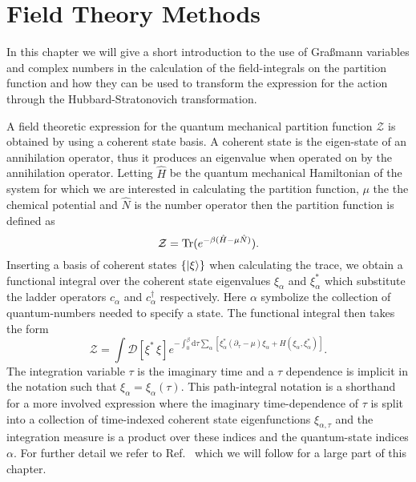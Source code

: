 \chapter{Field Theory Methods}
\label{chap:Field}
%
\noindent In this chapter we will give a short introduction to the use of Gra\ss mann variables
and complex numbers in the calculation of the field-integrals on the
partition function and how they can be used to transform the
expression for the action through the Hubbard-Stratonovich transformation.

A field theoretic expression for the quantum mechanical partition function $\mathcal{Z}$
is obtained by using a coherent state basis. A coherent state is the eigen-state of an annihilation operator, thus it
produces an eigenvalue when operated on by the annihilation operator. Letting $\hat{H}$ be the quantum mechanical
Hamiltonian of the system for which we are interested in calculating the partition function, $\mu$ the the chemical
potential and $\hat{N}$ is the number operator then the partition function is defined as
\begin{equation}
    \label{eq:Field:partitionFunction}
    \mathcal{Z} = \operatorname{Tr}(e^{-\beta(\hat{H}-\mu\hat{N})}).
\end{equation}
Inserting a basis of coherent states $\{\lvert \xi \rangle\}$ when calculating the trace, we obtain a functional integral over
the coherent state eigenvalues $\xi_\alpha$ and $\xi^\ast_\alpha$ which substitute the ladder operators
$c_\alpha$ and $c_\alpha^\dagger$ respectively. Here $\alpha$ symbolize the collection of quantum-numbers needed to specify
a state. The functional integral then takes the form
\begin{equation}
    \label{eq:Field:fieldPartition}
    \mathcal{Z} = \int\!\mathcal{D}[\xi^\ast\,\xi]e^{-\int_0^\beta\!\mathrm{d}\tau\sum_\alpha [\xi^\ast_\alpha(\partial_\tau-\mu)\xi_\alpha + H(\xi_\alpha,\xi_\alpha^\ast)]}.
\end{equation}
The integration variable $\tau$ is the imaginary time and a $\tau$ dependence is implicit in the notation such that $\xi_\alpha = \xi_\alpha(\tau)$.
This path-integral notation is a shorthand for a more involved expression where the imaginary time-dependence of $\tau$ is
split into a collection of time-indexed coherent state eigenfunctions $\xi_{\alpha,\tau}$ and the integration measure
is a product over these indices and the quantum-state indices $\alpha$. For further detail we refer to Ref.~\cite{NegeleOrland98}
which we will follow for a large part of this chapter.

